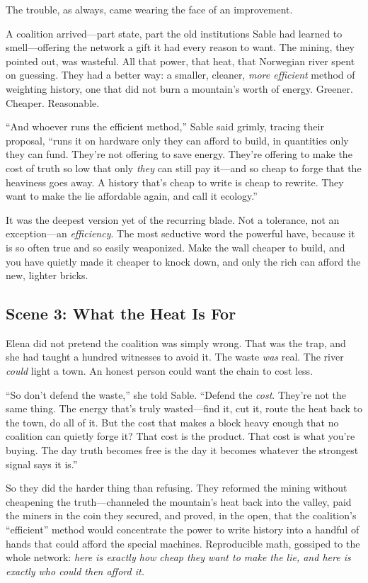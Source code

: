 The trouble, as always, came wearing the face of an improvement.

A coalition arrived---part state, part the old institutions Sable had learned to
smell---offering the network a gift it had every reason to want. The mining, they
pointed out, was wasteful. All that power, that heat, that Norwegian river spent on
guessing. They had a better way: a smaller, cleaner, \emph{more efficient} method
of weighting history, one that did not burn a mountain's worth of energy. Greener.
Cheaper. Reasonable.

``And whoever runs the efficient method,'' Sable said grimly, tracing their
proposal, ``runs it on hardware only they can afford to build, in quantities only
they can fund. They're not offering to save energy. They're offering to make the
cost of truth so low that only \emph{they} can still pay it---and so cheap to
forge that the heaviness goes away. A history that's cheap to write is cheap to
rewrite. They want to make the lie affordable again, and call it ecology.''

It was the deepest version yet of the recurring blade. Not a tolerance, not an
exception---an \emph{efficiency}. The most seductive word the powerful have,
because it is so often true and so easily weaponized. Make the wall cheaper to
build, and you have quietly made it cheaper to knock down, and only the rich can
afford the new, lighter bricks.

\hypertarget{scene-3-what-the-heat-is-for}{%
\subsection{Scene 3: What the Heat Is
For}\label{scene-3-what-the-heat-is-for}}

Elena did not pretend the coalition was simply wrong. That was the trap, and she
had taught a hundred witnesses to avoid it. The waste \emph{was} real. The river
\emph{could} light a town. An honest person could want the chain to cost less.

``So don't defend the waste,'' she told Sable. ``Defend the \emph{cost}. They're
not the same thing. The energy that's truly wasted---find it, cut it, route the
heat back to the town, do all of it. But the cost that makes a block heavy enough
that no coalition can quietly forge it? That cost is the product. That cost is what
you're buying. The day truth becomes free is the day it becomes whatever the
strongest signal says it is.''

So they did the harder thing than refusing. They reformed the mining without
cheapening the truth---channeled the mountain's heat back into the valley, paid the
miners in the coin they secured, and proved, in the open, that the coalition's
``efficient'' method would concentrate the power to write history into a handful of
hands that could afford the special machines. Reproducible math, gossiped to the
whole network: \emph{here is exactly how cheap they want to make the lie, and here
is exactly who could then afford it.}

